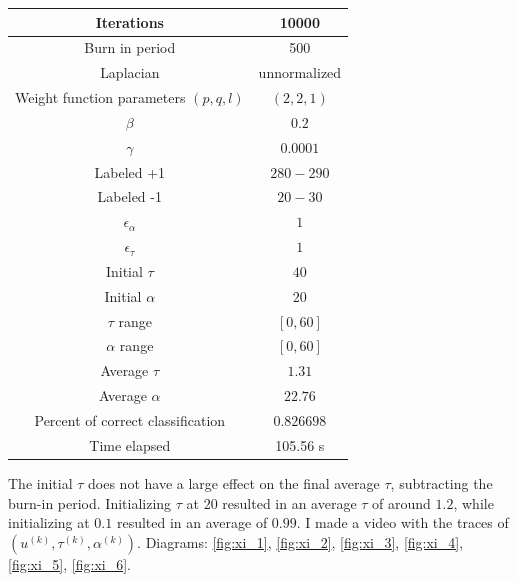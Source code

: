 \documentclass{siamart1116}
\begin{document}
\begin{center}
\begin{tabular}{| c | c |}
\hline
Iterations & 10000 \\ \hline
Burn in period & 500 \\ \hline
Laplacian & unnormalized \\ \hline
Weight function parameters $(p, q, l)$ & $(2,2,1)$ \\ \hline
$\beta$             & $0.2$\\ \hline
$\gamma$            & $0.0001$\\ \hline
Labeled +1          & $280-290$ \\ \hline
Labeled -1          & $20-30$ \\ \hline
$\epsilon_\alpha$   & $1$\\ \hline
$\epsilon_\tau$     & $1$\\ \hline
Initial $\tau$      & $40$\\ \hline
Initial $\alpha$    & $20$\\ \hline
$\tau$ range        & $[0, 60]$\\ \hline
$\alpha$ range      & $[0, 60]$\\ \hline
Average $\tau$      & $1.31$\\ \hline
Average $\alpha$    & $22.76$\\ \hline
Percent of correct classification & $0.826698$ \\ \hline
Time elapsed & 105.56 s \\ \hline
\end{tabular}
\end{center}
The initial $\tau$ does not have a large effect on the final average $\tau$, subtracting the burn-in period. Initializing $\tau$ at $20$ resulted in an average $\tau$ of around $1.2$, while initializing at $0.1$ resulted in an average of $0.99$. I made a video with the traces of $(u^{(k)}, \tau^{(k)}, \alpha^{(k)})$. Diagrams: \cref{fig:xi_1}, \cref{fig:xi_2}, \cref{fig:xi_3}, \cref{fig:xi_4}, \cref{fig:xi_5}, \cref{fig:xi_6}.
\end{document}
